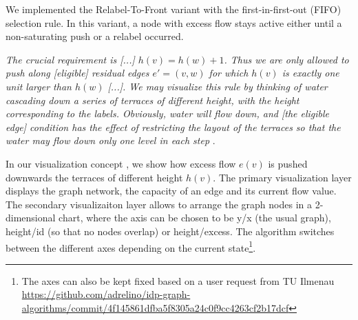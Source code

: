 We implemented the Relabel-To-Front variant with the first-in-first-out (FIFO) selection rule. In this variant, a node with excess flow stays active either until a non-saturating push or a relabel occurred. 


\textit{The crucial requirement is [...] $h(v) = h(w) + 1$. Thus we are only allowed to push along [eligible] residual edges $e'=(v,w)$ for which $h(v)$ is exactly one unit larger than $h(w)$ [...]. We may visualize this rule by thinking of water cascading down a series of terraces of different height, with the height corresponding to the labels. Obviously, water will flow down, and [the eligible edge] condition has the effect of restricting the layout of the terraces so that the water may flow down only one level in each step} \cite[sec. 6.6]{jungnickel2013graphs}.

In our visualization concept , we show how excess flow $e(v)$ is pushed downwards the terraces of different height $h(v)$. The primary visualization layer displays the graph network, the capacity of an edge and its current flow value. The secondary visualizaiton layer allows to arrange the graph nodes in a 2-dimensional chart, where the axis can be chosen to be y/x (the usual graph), height/id (so that no nodes overlap) or height/excess. The algorithm switches between the different axes depending on the current state\footnote{The axes can also be kept fixed based on a user request from TU Ilmenau \url{https://github.com/adrelino/idp-graph-algorithms/commit/4f145861dfba5f8305a24c0f9cc4263cf2b17dcf}}.

